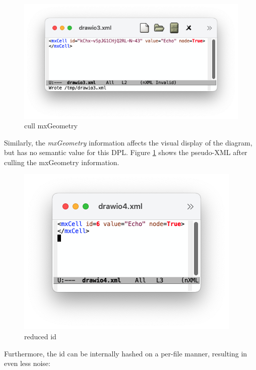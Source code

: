 \documentclass[10pt,anonymous,review]{acmart}
\begin{document}
 
\begin{figure}
    \includegraphics[scale=0.4]{./media/drawio3.png}
    \caption{cull mxGeometry}
    \label{drawio3}
\end{figure}
Similarly, the \emph{mxGeometry} information affects the visual display of the diagram, but has no semantic value for this DPL.
Figure \ref{drawio3} shows the pseudo-XML after culling the mxGeometry information.
  
\begin{figure}
    \includegraphics[scale=0.4]{./media/drawio4.png}
    \caption{reduced id}
    \label{drawio4}
\end{figure}
Furthermore, the id can be internally hashed on a per-file manner, resulting in even less noise:
\end{document}
